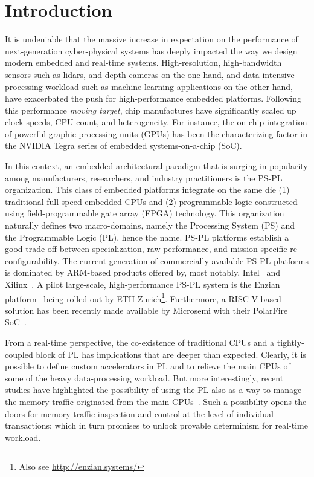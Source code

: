 \section{Introduction}

It is undeniable that the massive increase in expectation on the
performance of next-generation cyber-physical systems has deeply
impacted the way we design modern embedded and real-time
systems. High-resolution, high-bandwidth sensors such as lidars, and
depth cameras on the one hand, and data-intensive processing workload
such as machine-learning applications on the other hand, have
exacerbated the push for high-performance embedded
platforms. Following this performance \emph{moving target}, chip
manufactures have significantly scaled up clock speeds, CPU count, and
heterogeneity. For instance, the on-chip integration of powerful
graphic processing units (GPUs) has been the characterizing factor in
the NVIDIA Tegra series of embedded systems-on-a-chip (SoC).

In this context, an embedded architectural paradigm that is surging in
popularity among manufacturers, researchers, and industry
practitioners is the PS-PL organization. This class of embedded
platforms integrate on the same die (1) traditional full-speed
embedded CPUs and (2) programmable logic constructed using
field-programmable gate array (FPGA) technology. This organization
naturally defines two macro-domains, namely the Processing System (PS)
and the Programmable Logic (PL), hence the name. PS-PL platforms
establish a good trade-off between specialization, raw performance,
and mission-specific re-configurability. The current generation of
commercially available PS-PL platforms is dominated by ARM-based
products offered by, most notably, Intel~\cite{intel_stratix10} and
Xilinx~\cite{zynq_ultrascale}. A pilot large-scale, high-performance PS-PL
system is the Enzian platform~\cite{enzian2020cidr} being rolled out by ETH
Zurich\footnote{Also see \url{http://enzian.systems/}}. Furthermore, a
RISC-V-based solution has been recently made available by Microsemi
with their PolarFire SoC~\cite{microsemi_polarfire}. 

From a real-time perspective, the co-existence of traditional CPUs and
a tightly-coupled block of PL has implications that are deeper than
expected. Clearly, it is possible to define custom accelerators in PL
and to relieve the main CPUs of some of the heavy data-processing
workload. But more interestingly, recent studies have highlighted the
possibility of using the PL also as a way to manage the memory traffic
originated from the main CPUs~\cite{lime_2018, PLIM20}. Such a
possibility opens the doors for memory traffic inspection and control
at the level of individual transactions; which in turn promises to
unlock provable determinism for real-time workload.

